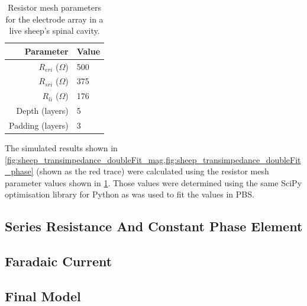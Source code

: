   \begin{table}
    \centering
    \begin{tabular}{r | l}
      Parameter & Value \\
      \hline
      $R_{eri}$ ($\Omega$)& 500\\
      $R_{sri}$ ($\Omega$)& 375\\
      $R_{li}$ ($\Omega$)& 176\\
      Depth (layers) & 5 \\
      Padding (layers) & 3 \\
    \end{tabular}
    \caption{\label{tab:RESparams_sheep}Resistor mesh parameters for the electrode array in a live sheep's spinal cavity.}
  \end{table}
  The simulated results shown in \cref{fig:sheep_transimpedance_doubleFit_mag,fig:sheep_transimpedance_doubleFit_phase} (shown as the red trace) were calculated using the resistor mesh parameter values shown in \cref{tab:RESparams_sheep}.
  Those values were determined using the same SciPy optimisation library for Python as was used to fit the values in PBS.



  \subsection{Series Resistance And Constant Phase Element}

  \subsection{Faradaic Current}
  \subsection{Final Model}
